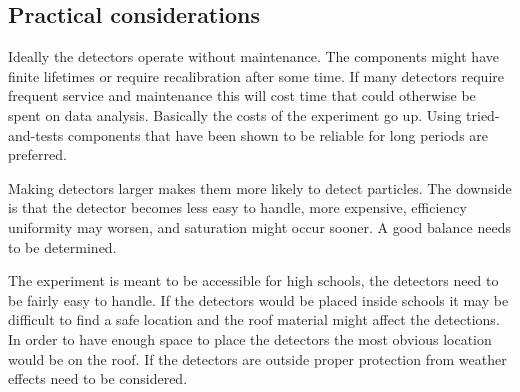 \subsection{Practical considerations}

Ideally the detectors operate without maintenance. The components might have finite lifetimes or require recalibration after some time. If many detectors require frequent service and maintenance this will cost time that could otherwise be spent on data analysis. Basically the costs of the experiment go up. Using tried-and-tests components that have been shown to be reliable for long periods are preferred.

Making detectors larger makes them more likely to detect particles. The downside is that the detector becomes less easy to handle, more expensive, efficiency uniformity may worsen, and saturation might occur sooner. A good balance needs to be determined.

The experiment is meant to be accessible for high schools, the detectors need to be fairly easy to handle. If the detectors would be placed inside schools it may be difficult to find a safe location and the roof material might affect the detections. In order to have enough space to place the detectors the most obvious location would be on the roof. If the detectors are outside proper protection from weather effects need to be considered.
